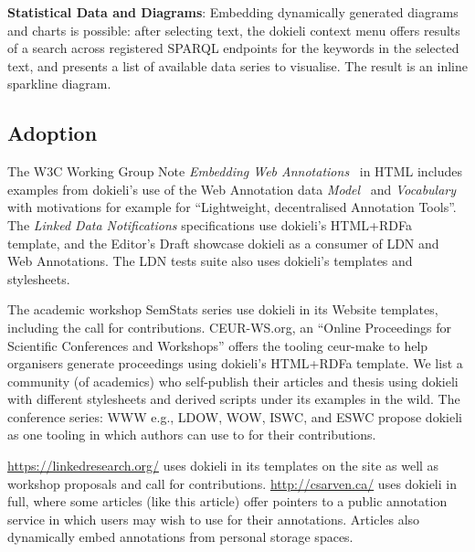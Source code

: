 \documentclass[a4paper]{llncs}
\begin{document}
                                    
\par \textbf{Statistical Data and Diagrams}: Embedding dynamically generated diagrams and charts is possible: after selecting text, the dokieli context menu offers results of a search across registered SPARQL endpoints for the keywords in the selected text, and presents a list of available data series to visualise. The result is an inline sparkline diagram.
                                
                            

                            
                                \subsection{Adoption}
  \label{adoption}

                                
                                    
\par The W3C Working Group Note \textit{Embedding Web Annotations}~\cite{ref-16} in HTML includes examples from dokieli’s use of the Web Annotation data \textit{Model}~\cite{ref-14} and \textit{Vocabulary}~\cite{ref-17} with motivations for example for ``Lightweight, decentralised Annotation Tools''.
                                    The \textit{Linked Data Notifications} specifications use dokieli’s HTML+RDFa template, and the \empty Editor’s Draft showcase dokieli as a consumer of LDN and Web Annotations. The LDN \empty tests suite also uses dokieli’s templates and stylesheets.

                                    
\par The academic workshop SemStats series use dokieli in its Website templates, including the call for contributions. CEUR-WS.org, an ``Online Proceedings for Scientific Conferences and Workshops'' offers the tooling ceur-make to help organisers generate proceedings using dokieli’s HTML+RDFa template.
                                    We list a community (of academics) who self-publish their articles and thesis using dokieli with different stylesheets and derived scripts under its examples in the wild. The conference series: WWW e.g., LDOW, WOW, ISWC, and ESWC propose dokieli as one tooling in which authors can use to for their contributions.

                                    
\par \url{https://linkedresearch.org/} uses dokieli in its templates on the site as well as workshop proposals and call for contributions.
                                    \url{http://csarven.ca/} uses dokieli in full, where some articles (like this article) offer pointers to a public annotation service in which users may wish to use for their annotations. Articles also dynamically embed annotations from personal storage spaces.
                                
\end{document}
